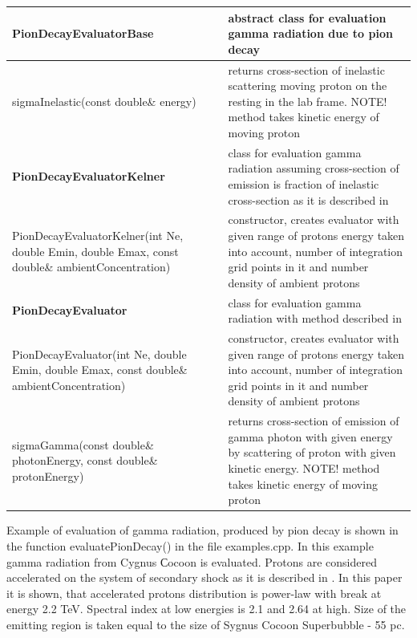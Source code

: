 		\begin{small}
			\label{pionDecay}
			\begin{xtabular}{|p{0.5\textwidth}|p{0.5\textwidth}|}  
				\hline
				\textbf{PionDecayEvaluatorBase} & abstract class for evaluation gamma radiation due to pion decay\\
				\hline
				sigmaInelastic(const double\& energy) & returns cross-section of inelastic scattering moving proton on the resting in the lab frame. NOTE! method takes kinetic energy of moving proton\\
				\hline
				\textbf{PionDecayEvaluatorKelner} &
				class for evaluation gamma radiation assuming cross-section of emission is fraction of inelastic cross-section as it is described in \cite{Kelner}\\
				\hline
				PionDecayEvaluatorKelner(int Ne, double Emin, double Emax, const double\& ambientConcentration) & constructor, creates evaluator with given range of protons energy taken into account, number of integration grid points in it and number density of ambient protons \\
				\hline
				\textbf{PionDecayEvaluator} & class for evaluation gamma radiation with method described in \cite{Kafexhiu}\\
				\hline
				PionDecayEvaluator(int Ne, double Emin, double Emax, const double\& ambientConcentration) & constructor, creates evaluator with given range of protons energy taken into account, number of integration grid points in it and number density of ambient protons\\
				\hline
				sigmaGamma(const double\& photonEnergy, const double\& protonEnergy) & returns cross-section of emission of gamma photon with given energy by scattering of proton with given kinetic energy.
		        NOTE! method takes kinetic energy of moving proton\\
				\hline
			\end{xtabular}
		\end{small}
	
Example of evaluation of gamma radiation, produced by pion decay is shown in the function evaluatePionDecay() in the file examples.cpp. In this example gamma radiation from Cygnus Сocoon is evaluated. Protons are considered accelerated on the system of secondary shock as it is described in \cite{BykovKalyashova2022}. In this paper it is shown, that accelerated protons distribution is power-law with break at energy 2.2 TeV. Spectral index at low energies is 2.1 and 2.64 at high. Size of the emitting region is taken equal to the size of  Sygnus Cocoon Superbubble - 55 pc.

